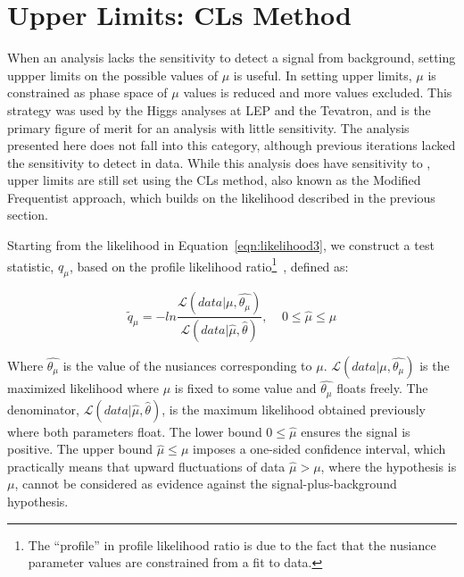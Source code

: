 \section{Upper Limits: CLs Method}
\label{sec:limit}
When an analysis lacks the sensitivity to detect a signal from background, setting uppper limits on the possible values of $\mu$ is useful. In setting upper
limits, $\mu$ is constrained as phase space of $\mu$ values is reduced and more values excluded. This strategy was used by the Higgs analyses at LEP and the Tevatron, and is the primary figure of merit
for an analysis with little sensitivity. The \tth analysis presented here does not fall into this category, although previous iterations lacked the sensitivity
to detect \tth in data. While this analysis does have sensitivity to \tth, upper limits are still set using the CLs method, also known as the
Modified Frequentist approach, which builds on the likelihood described in the previous section. 

Starting from the likelihood in Equation~\ref{eqn:likelihood3}, we construct a test statistic, $q_{\mu}$, based on the profile likelihood ratio\footnote{The ``profile'' in profile
likelihood ratio is due to the fact that the nusiance parameter values are constrained from a fit to data.}~\cite{AsymptoticLimits},
defined as:

\begin{equation}
\label{eqn:test_stat}
\tilde{q}_{\mu} = -ln \frac{\mathcal{L}(data|\mu,\hat{\theta_{\mu}})}{\mathcal{L}(data|\hat{\mu},\hat{\theta})},~~~~~0 \leq \hat{\mu} \leq{\mu}
\end{equation}

\noindent Where $\hat{\theta_{\mu}}$ is the value of the nusiances corresponding to $\mu$. $\mathcal{L}(data|\mu,\hat{\theta_{\mu}})$ is the maximized likelihood where $\mu$
is fixed to some value and $\hat{\theta_{\mu}}$ floats freely. The denominator, $\mathcal{L}(data|\hat{\mu},\hat{\theta})$, is the maximum likelihood obtained
previously where both parameters float. The lower bound $0 \leq \hat{\mu}$ ensures the signal is positive. The upper bound $\hat{\mu} \leq \mu$ imposes a one-sided
confidence interval, which practically means that upward fluctuations of data $\hat{\mu} > \mu$, where the hypothesis is $\mu$, cannot be considered as evidence
against the signal-plus-background hypothesis.  

